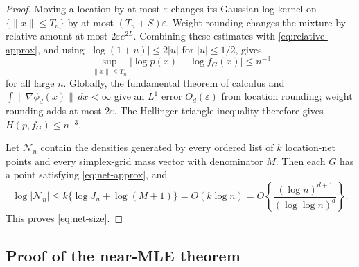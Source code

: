 \documentclass[11pt]{article}
\theoremstyle{definition}
\theoremstyle{remark}
\newcommand{\Ncal}{\mathcal N}
\newcommand{\norm}[1]{\lVert #1\rVert}
\newcommand{\abs}[1]{\lvert #1\rvert}
\newcommand{\eps}{\varepsilon}
\begin{document}
\begin{proof}
Moving a location by at most $\eps$ changes its Gaussian log kernel on
$\{\norm{x}\le T_n\}$ by at most $(T_n+S)\eps$.  Weight rounding changes the
mixture by relative amount at most $2\eps e^{2L}$.  Combining these estimates
with \eqref{eq:relative-approx}, and using
$\abs{\log(1+u)}\le2\abs{u}$ for $\abs{u}\le1/2$, gives
\[
 \sup_{\norm{x}\le T_n}\abs{\log p(x)-\log f_G(x)}\le n^{-3}
\]
for all large $n$.  Globally, the fundamental theorem of calculus and
$\int\norm{\nabla\phi_d(x)}\,dx<\infty$ give an $L^1$ error $O_d(\eps)$ from
location rounding; weight rounding adds at most $2\eps$.  The Hellinger
triangle inequality therefore gives $H(p,f_G)\le n^{-3}$.

Let $\Ncal_n$ contain the densities generated by every ordered list of $k$
location-net points and every simplex-grid mass vector with denominator $M$.
Then each $G$ has a point satisfying \eqref{eq:net-approx}, and
\[
 \log\abs{\Ncal_n}
 \le k\{\log J_n+\log(M+1)\}
 =O(k\log n)
 =O\left\{\frac{(\log n)^{d+1}}{(\log\log n)^d}\right\}.
\]
This proves \eqref{eq:net-size}.
\end{proof}

\subsection{Proof of the near-MLE theorem}
\end{document}
